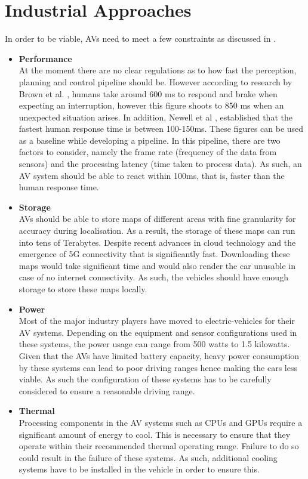\section{Industrial Approaches}
In order to be viable, AVs need to meet a few constraints as discussed in \cite{lin2018architectural}.
\begin{itemize}
	\item \textbf{Performance} \\
	At the moment there are no clear regulations as to how fast the perception, planning and control pipeline should be. However according to research by Brown et al. \cite{brown1994human}, humans take around 600 ms to respond and brake when expecting an interruption, however this figure shoots to 850 ms when an unexpected situation arises. In addition, Newell et al \cite{newell1985prospects}, established that the fastest human response time is between 100-150ms. These figures can be used as a baseline while developing a pipeline. In this pipeline, there are two factors to consider, namely the frame rate (frequency of the data from sensors) and the processing latency (time taken to process data). As such, an AV system should be able to react within 100ms, that is, faster than the human response time.
	
	\item \textbf{Storage} \\ 
	AVs should be able to store maps of different areas with fine granularity for accuracy during localisation. As a result, the storage of these maps can run into tens of Terabytes. Despite recent advances in cloud technology and the emergence of 5G connectivity that is significantly fast. Downloading these maps would take significant time and would also render the car unusable in case of no internet connectivity. As such, the vehicles should have enough storage to store these maps locally. 
	
	\item \textbf{Power} \\
	Most of the major industry players have moved to electric-vehicles for their AV systems. Depending on the equipment and sensor configurations used in these systems, the power usage can range from 500 watts to 1.5 kilowatts. Given that the AVs have limited battery capacity, heavy power consumption by these systems can lead to poor driving ranges hence making the cars less viable. As such the configuration of these systems has to be carefully considered to ensure a reasonable driving range. 

	\item \textbf{Thermal} \\
	Processing components in the AV systems such as CPUs and GPUs require a significant amount of energy to cool. This is necessary to ensure that they operate within their recommended thermal operating range. Failure to do so could result in the failure of these systems. As such, additional cooling systems have to be installed in the vehicle in order to ensure this.
	
\end{itemize}
